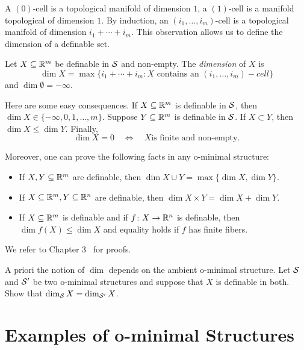 A $(0)$-cell is a topological manifold of dimension $1$, a $(1)$-cell
is a manifold topological of dimension $1$. By induction, an
$(i_1,\ldots,i_m)$-cell is a topological manifold of dimension
$i_1+\cdots+i_m$. This observation allows us to define the dimension
of a definable set.
 
\begin{definition}
  Let $X\subseteq{\mathbb{R}}^m$ be definable in ${\mathcal S}$ and non-empty. The
  \emph{dimension} of $X$ is
  \begin{equation*}
    \dim X = \max \{i_1+\cdots+i_m: X\text{ contains an
    }(i_1,\ldots,i_m)-cell\}
  \end{equation*}
  and $\dim \emptyset=-\infty$. 
\end{definition}

\begin{remark}
  Here are some easy consequences. If $X\subseteq{\mathbb{R}}^m$ is definable in
  ${\mathcal S}$, then $\dim X \in\{-\infty,0,1,\ldots,m\}$.
  Suppose $Y\subseteq{\mathbb{R}}^m$ is definable in ${\mathcal S}$. If $X\subset Y$, then
  $\dim X\le \dim Y$. 
  Finally,
  \begin{equation*}
    \dim X = 0 \quad\Longleftrightarrow\quad \text{$X$
      is finite and non-empty.}
  \end{equation*}

  Moreover, one can prove the following facts in any o-minimal structure:
  \begin{itemize}  
  \item If $X,Y\subseteq{\mathbb{R}}^m$ are definable, then  $\dim X\cup Y = \max\{\dim X,\dim Y\}$.
  \item If $X\subseteq{\mathbb{R}}^m,Y\subseteq{\mathbb{R}}^n$ are definable, then  $\dim
    X\times Y = \dim X +\dim Y$.
  \item If $X\subseteq{\mathbb{R}}^m$ is definable and if $f\colon
    X\rightarrow{\mathbb{R}}^n$ is definable, then $\dim f(X) \le \dim X$ and
    equality holds if $f$ has finite fibers.
  \end{itemize}

  We refer to Chapter 3~\cite{D:oMin} for proofs. 
\end{remark}

\begin{exercise}
  A priori the notion of $\dim$ depends on the ambient o-minimal
  structure. Let ${\mathcal S}$ and ${\mathcal S}'$ be two o-minimal structures and
  suppose that $X$ is definable in both. Show that $\dim_{{\mathcal S}} X =
  \dim_{{\mathcal S}'} X$.
\end{exercise}

\section{Examples of o-minimal Structures}

